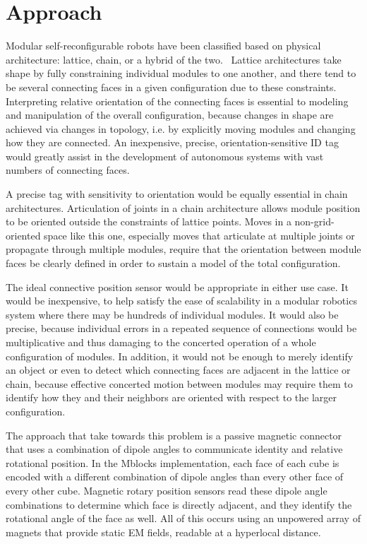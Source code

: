 \section{Approach}
\label{sec:Approach}

Modular self-reconfigurable robots have been classified based on physical architecture: lattice, chain, or a hybrid of the two.~\cite{Yim-RAM07}\cite{Moubarak2012}\cite{surveyyim} Lattice architectures take shape by fully constraining individual modules to one another, and there tend to be several connecting faces in a given configuration due to these constraints. Interpreting relative orientation of the connecting faces is essential to modeling and manipulation of the overall configuration, because changes in shape are achieved via changes in topology, i.e. by explicitly moving modules and changing how they are connected. An inexpensive, precise, orientation-sensitive ID tag would greatly assist in the development of autonomous systems with vast numbers of connecting faces.

A precise tag with sensitivity to orientation would be equally essential in chain architectures. Articulation of joints in a chain architecture allows module position to be oriented outside the constraints of lattice points. Moves in a non-grid-oriented space like this one, especially moves that articulate at multiple joints or propagate through multiple modules, require that the orientation between module faces be clearly defined in order to sustain a model of the total configuration.

The ideal connective position sensor would be appropriate in either use case. It would be inexpensive, to help satisfy the ease of scalability in a modular robotics system where there may be hundreds of individual modules. It would also be precise, because individual errors in a repeated sequence of connections would be multiplicative and thus damaging to the concerted operation of a whole configuration of modules. In addition, it would not be enough to merely identify an object or even to detect which connecting faces are adjacent in the lattice or chain, because effective concerted motion between modules may require them to identify how they and their neighbors are oriented with respect to the larger configuration.

The approach that \tagNames take towards this problem is a passive magnetic connector that uses a combination of dipole angles to communicate identity and relative rotational position. In the Mblocks implementation, each face of each cube is encoded with a different combination of dipole angles than every other face of every other cube. Magnetic rotary position sensors read these dipole angle combinations to determine which face is directly adjacent, and they identify the rotational angle of the face as well. All of this occurs using an unpowered array of magnets that provide static EM fields, readable at a hyperlocal distance.

